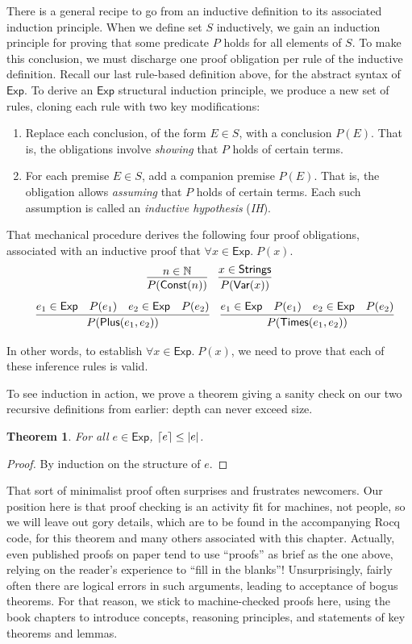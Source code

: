 \documentclass{amsbook}
\newtheorem{theorem}{Theorem}[chapter]
\theoremstyle{definition}
\theoremstyle{remark}
\numberwithin{section}{chapter}
\numberwithin{equation}{chapter}
\begin{document}
There is a general recipe to go from an inductive definition to its associated induction principle.
When we define set $S$ inductively, we gain an induction principle for proving that some predicate $P$ holds for all elements of $S$.
To make this conclusion, we must discharge one proof obligation per rule of the inductive definition.
Recall our last rule-based definition above, for the abstract syntax of $\mathsf{Exp}$.
To derive an $\mathsf{Exp}$ structural induction principle, we produce a new set of rules, cloning each rule with two key modifications:
\begin{enumerate}
  \item Replace each conclusion, of the form $E \in S$, with a conclusion $P(E)$.  That is, the obligations involve \emph{showing} that $P$ holds of certain terms.
  \item For each premise $E \in S$, add a companion premise $P(E)$.  That is, the obligation allows \emph{assuming} that $P$ holds of certain terms.  Each such assumption is called an \emph{inductive hypothesis} (\emph{IH}).
\end{enumerate}

That mechanical procedure derives the following four proof obligations, associated with an inductive proof that $\forall x \in \mathsf{Exp}. \; P(x)$.
$$\infer{P(\mathsf{Const}(n))}{
  n \in \mathbb N
}
\quad \infer{P(\mathsf{Var}(x))}{
  x \in \mathsf{Strings}
}$$
$$\quad \infer{P(\mathsf{Plus}(e_1, e_2))}{
  e_1 \in \mathsf{Exp}
  & P(e_1)
  & e_2 \in \mathsf{Exp}
  & P(e_2)
}
\quad \infer{P(\mathsf{Times}(e_1, e_2))}{
  e_1 \in \mathsf{Exp}
  & P(e_1)
  & e_2 \in \mathsf{Exp}
  & P(e_2)
}$$

In other words, to establish $\forall x \in \mathsf{Exp}. \; P(x)$, we need to prove that each of these inference rules is valid.

To see induction in action, we prove a theorem giving a sanity check on our two recursive definitions from earlier: depth can never exceed size.
\begin{theorem}
  For all $e \in \mathsf{Exp}$, ${\left \lceil e \right \rceil} \leq {\left \lvert e \right \rvert}$.
\end{theorem}
\begin{proof}
  By induction on the structure of $e$.
\end{proof}

That sort of minimalist proof often surprises and frustrates newcomers.
Our position here is that proof checking is an activity fit for machines, not people, so we will leave out gory details, which are to be found in the accompanying Rocq code, for this theorem and many others associated with this chapter.
Actually, even published proofs on paper tend to use ``proofs'' as brief as the one above, relying on the reader's experience to ``fill in the blanks''!
Unsurprisingly, fairly often there are logical errors in such arguments, leading to acceptance of bogus theorems.
For that reason, we stick to machine-checked proofs here, using the book chapters to introduce concepts, reasoning principles, and statements of key theorems and lemmas.
\end{document}
